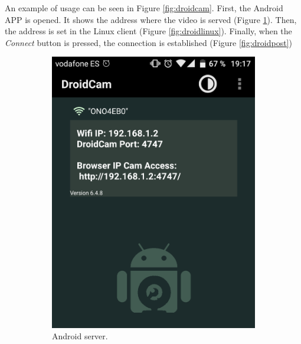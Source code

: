 An example of usage can be seen in Figure \ref{fig:droidcam}. First, the Android APP is opened. It shows the address where the video is served (Figure \ref{fig:droidpre}). Then, the address is set in the Linux client (Figure \ref{fig:droidlinux}). Finally, when the \textit{Connect} button is pressed, the connection is established (Figure \ref{fig:droidpost})
\begin{figure}
	\centering
	\begin{subfigure}{0.33\textwidth}
		\centering
		\includegraphics[width=0.9\linewidth]{figures/droidcampre.png}
		\caption{Android server.}
		\label{fig:droidpre}
	\end{subfigure}%
	\begin{subfigure}{0.33\textwidth}
		\centering

\end{subfigure}
\end{figure}
